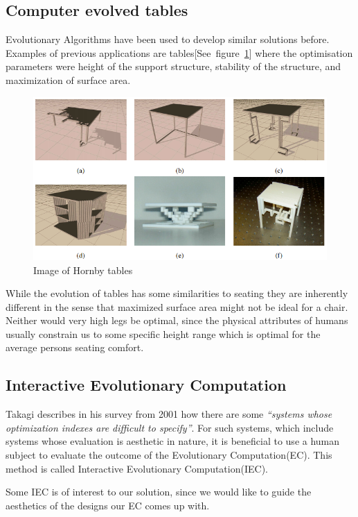 \subsection{Computer evolved tables}
Evolutionary Algorithms have been used to develop similar solutions before. 
Examples of previous  applications are 
tables[See~figure~\ref{fig:hornby_tables}] where the optimisation parameters 
were height of the support structure, stability of the structure, and 
maximization of surface area.
\begin{figure}[ht]
\includegraphics[scale=.6]{content/img/tables}
\caption{Image of Hornby tables\cite{paper:ev4}}
\label{fig:hornby_tables}
\end{figure}

While the evolution of tables has some similarities to seating they are 
inherently
different in the sense that maximized surface area might not be ideal for a
chair.
Neither would very high legs be optimal, since the physical attributes of humans
usually constrain us to some specific height range which is optimal for the
average persons seating comfort.

\subsection{Interactive Evolutionary Computation}
Takagi describes in his survey from 2001\cite{Takagi2001} how there are some 
\emph{``systems whose optimization indexes are difficult to 
specify''}\cite[p.~1275]{Takagi2001}.
For such systems, which include systems whose evaluation is aesthetic in 
nature, it is beneficial to use a human subject to evaluate the outcome of the 
Evolutionary Computation(EC).
This method is called Interactive Evolutionary Computation(IEC).

Some IEC is of interest to our solution, since we would like to guide the 
aesthetics of the designs our EC comes up with. 

